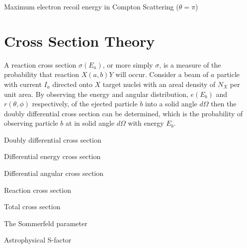 \noindent
Maximum electron recoil energy in Compton Scattering ($\theta = \pi$) 


\section{Cross Section Theory}
A reaction cross section $\sigma(E_a)$, or more simply $\sigma$, is a
measure of the probability that reaction $X(a,b)Y$ will occur.
Consider a beam of $a$ particle with current $I_a$ directed onto $X$
target nuclei with an areal density of $N_X$ per unit area.  By
observing the energy and angular distribution, $e(E_b)$ and
$r(\theta,\phi)$ respectively, of the ejected particle $b$ into a
solid angle $d\Omega$ then the doubly differential cross section can
be determined, which is the probability of observing particle $b$ at
in solid angle $d\Omega$ with energy $E_b$. 
\newline
\newline

\noindent
Doubly differential cross section 

\noindent
Differential energy cross section 

\noindent
Differential angular cross section 

\noindent
Reaction cross section 

\noindent
Total cross section 

\noindent
The Sommerfeld parameter 

\noindent
Astrophysical S-factor 


